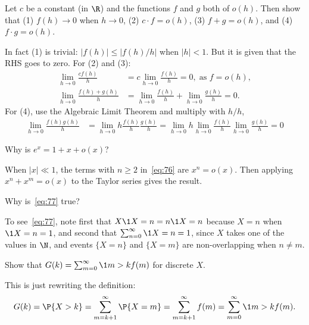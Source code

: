 \documentclass[queueing_book]{subfiles}
\begin{document}
\begin{exercise}\label{ex:l-104}
 Let $c$ be a constant (in $\R$) and the functions $f$ and $g$ both of $o(h)$. Then show that (1) $f(h) \to 0$ when $h\to 0$, (2) $c\cdot f = o(h)$, (3) $f+g=o(h)$, and (4) $f\cdot g=o(h)$.
\begin{solution}
 In fact (1) is trivial: $|f(h)| \leq |f(h)/h|$ when $|h| < 1$.
 But it is given that the RHS goes to zero.
 For (2) and (3):
\begin{align*}
\lim_{h\to 0} \frac{c f(h)}{h} &= c \lim_{h\to 0} \frac{f(h)}{h} = 0, \; \text{as } f = o(h), \\
\lim_{h\to 0} \frac{f(h) + g(h)} h &= \lim_{h\to 0} \frac{f(h)} h + \lim_{h\to 0} \frac{g(h)} h = 0.
\end{align*}
For (4), use the Algebraic Limit Theorem and multiply with $h/h$,
\begin{align*}
\lim_{h\to 0} \frac{f(h)g(h)}{h} &= \lim_{h\to 0} h \frac{f(h)}{h} \frac{g(h)}{h}
= \lim_{h\to 0} h \lim_{h\to 0} \frac{f(h)}{h} \lim_{h\to 0} \frac{g(h)}{h} = 0
\end{align*}
\end{solution}
\end{exercise}


\begin{exercise}\label{ex:87}
 Why is $e^{x} = 1 +x + o(x)$?
\begin{solution}
 When $|x|\ll 1$, the terms with $n\geq 2$ in~\cref{eq:76} are $x^n = o(x)$. Then applying $x^n + x^m = o(x)$ to the Taylor series gives the result.
\end{solution}
\end{exercise}

\begin{exercise}
 Why is~\cref{eq:77} true?
\begin{solution}
To see~\cref{eq:77}, note first that $X\1{X=n} = n\1{X=n}$ because $X=n$ when $\1{X=n} =1$, and second that $\sum_{n=0}^\infty \1{X=n} =1$, since $X$ takes one of the values in $\N$, and events $\{X=n\}$ and $\{X=m\}$ are non-overlapping when $n\neq m$.
\end{solution}
\end{exercise}

\begin{exercise}\label{ex:l-105}
Show that $G(k) = \sum_{m=0}^\infty \1{m>k} f(m)$ for discrete $X$.
\begin{solution}
 This is just rewriting the definition:
\begin{equation*}
G(k) = \P{X>k} = \sum_{m=k+1}^\infty \P{X=m} = \sum_{m=k+1}^\infty f(m)=\sum_{m=0}^\infty \1{m>k}f(m).
\end{equation*}
\end{solution}
\end{exercise}
\end{document}
